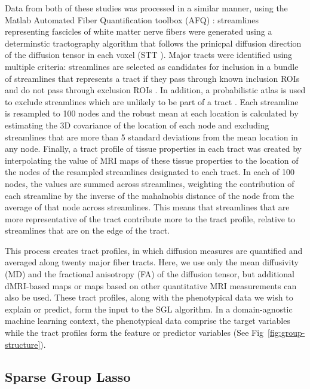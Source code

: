 Data from both of these studies was processed in a similar manner, using the
Matlab Automated Fiber Quantification toolbox (AFQ) \cite{yeatman2012tract}:
streamlines representing fascicles of white matter nerve fibers were generated
using a determinstic tractography algorithm that follows the prinicpal diffusion
direction of the diffusion tensor in each voxel (STT \cite{basser2000vivo}).
Major tracts were identified using multiple criteria: streamlines are selected
as candidates for inclusion in a bundle of streamlines that represents a tract
if they pass through known inclusion ROIs and do not pass through exclusion ROIs
\cite{wakana2007reproducibility}. In addition, a probabilistic atlas is used to
exclude streamlines which are unlikely to be part of a tract \cite{Hua2008-sh}.
Each streamline is resampled to 100 nodes and the robust mean at each location
is calculated by estimating the 3D covariance of the location of each node and
excluding streamlines that are more than 5 standard deviations from the mean
location in any node. Finally, a tract profile of tissue properties in each
tract was created by interpolating the value of MRI maps of these tissue
properties to the location of the nodes of the resampled streamlines designated
to each tract. In each of 100 nodes, the values are summed across streamlines,
weighting the contribution of each streamline by the inverse of the mahalnobis
distance of the node from the average  of that node across streamlines. This
means that streamlines that are more representative of the tract contribute more
to the tract profile, relative to streamlines that are on the edge of the tract.

This process creates tract profiles, in which diffusion measures are quantified
and averaged along twenty major fiber tracts. Here, we use only the mean
diffusivity (MD) and the fractional anisotropy (FA) of the diffusion tensor, but
additional dMRI-based maps or maps based on other quantitative MRI measurements
can also be used. These tract profiles, along with the phenotypical data we wish
to explain or predict, form the input to the SGL algorithm. In a domain-agnostic
machine learning context, the phenotypical data comprise the target variables
while the tract profiles form the feature or predictor variables (See
Fig~\ref{fig:group-structure}).

\subsection*{Sparse Group Lasso}

